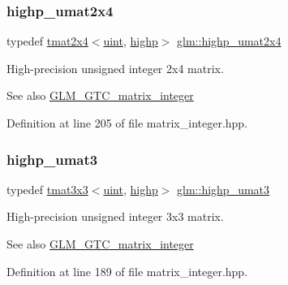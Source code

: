 \subsubsection{\texorpdfstring{highp\_umat2x4}{highp\_umat2x4}}
{\footnotesize\ttfamily typedef \mbox{\hyperlink{structglm_1_1tmat2x4}{tmat2x4}}$<$\mbox{\hyperlink{group__core__precision_ga4fd29415871152bfb5abd588334147c8}{uint}}, \mbox{\hyperlink{namespaceglm_a0f04f086094c747d227af4425893f545ac6f7eab42eacbb10d59a58e95e362074}{highp}}$>$ \mbox{\hyperlink{group__gtc__matrix__integer_gafcec07e857ea0445d93680411e86482c}{glm\+::highp\+\_\+umat2x4}}}

High-\/precision unsigned integer 2x4 matrix. \begin{DoxySeeAlso}{See also}
\mbox{\hyperlink{group__gtc__matrix__integer}{G\+L\+M\+\_\+\+G\+T\+C\+\_\+matrix\+\_\+integer}} 
\end{DoxySeeAlso}


Definition at line 205 of file matrix\+\_\+integer.\+hpp.

\mbox{\label{group__gtc__matrix__integer_ga58bc8d0aeac88af0d38723b5cfa4fa67}} 
\subsubsection{\texorpdfstring{highp\_umat3}{highp\_umat3}}
{\footnotesize\ttfamily typedef \mbox{\hyperlink{structglm_1_1tmat3x3}{tmat3x3}}$<$\mbox{\hyperlink{group__core__precision_ga4fd29415871152bfb5abd588334147c8}{uint}}, \mbox{\hyperlink{namespaceglm_a0f04f086094c747d227af4425893f545ac6f7eab42eacbb10d59a58e95e362074}{highp}}$>$ \mbox{\hyperlink{group__gtc__matrix__integer_ga58bc8d0aeac88af0d38723b5cfa4fa67}{glm\+::highp\+\_\+umat3}}}

High-\/precision unsigned integer 3x3 matrix. \begin{DoxySeeAlso}{See also}
\mbox{\hyperlink{group__gtc__matrix__integer}{G\+L\+M\+\_\+\+G\+T\+C\+\_\+matrix\+\_\+integer}} 
\end{DoxySeeAlso}


Definition at line 189 of file matrix\+\_\+integer.\+hpp.

\mbox{\label{group__gtc__matrix__integer_ga7484178233773045088b42f362dade86}} 
